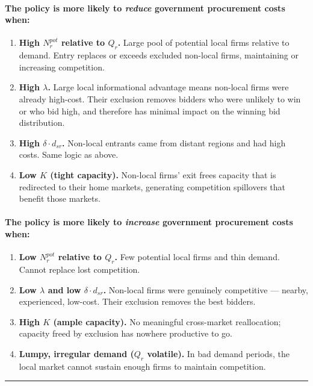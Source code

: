 \documentclass[10pt]{article}
\begin{document}
\paragraph{The policy is more likely to \emph{reduce} government procurement costs when:}
\begin{enumerate}
  \item \textbf{High $N_r^{pot}$ relative to $Q_r$.} Large pool of potential local firms relative to demand. Entry replaces or exceeds excluded non-local firms, maintaining or increasing competition.
  \item \textbf{High $\lambda$.} Large local informational advantage means non-local firms were already high-cost. Their exclusion removes bidders who were unlikely to win or who bid high, and therefore has minimal impact on the winning bid distribution.
  \item \textbf{High $\delta \cdot d_{sr}$.} Non-local entrants came from distant regions and had high costs. Same logic as above.
  \item \textbf{Low $K$ (tight capacity).} Non-local firms' exit frees capacity that is redirected to their home markets, generating competition spillovers that benefit those markets.
\end{enumerate}

\paragraph{The policy is more likely to \emph{increase} government procurement costs when:}
\begin{enumerate}
  \item \textbf{Low $N_r^{pot}$ relative to $Q_r$.} Few potential local firms and thin demand. Cannot replace lost competition.
  \item \textbf{Low $\lambda$ and low $\delta \cdot d_{sr}$.} Non-local firms were genuinely competitive --- nearby, experienced, low-cost. Their exclusion removes the best bidders.
  \item \textbf{High $K$ (ample capacity).} No meaningful cross-market reallocation; capacity freed by exclusion has nowhere productive to go.
  \item \textbf{Lumpy, irregular demand ($Q_r$ volatile).} In bad demand periods, the local market cannot sustain enough firms to maintain competition.
\end{enumerate}

\bigskip\hrule\bigskip

\end{document}

